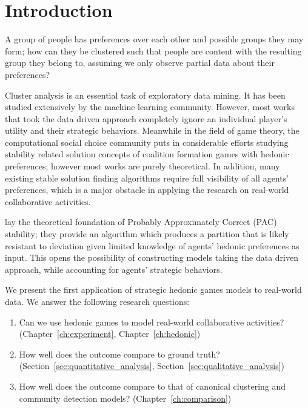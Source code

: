 
\chapter{Introduction}
\label{ch:intro}

A group of people has preferences over each other and possible groups
they may form; how can they be clustered such that people are content
with the resulting group they belong to, assuming we only observe partial data about their preferences?

Cluster analysis is an essential task of exploratory data mining.
It has been studied extensively by the machine learning community.
However, most works that took the data driven approach completely ignore an individual player's utility and their strategic behaviors.
Meanwhile in the field of game theory, the computational social choice community puts in considerable efforts studying stability related solution concepts of coalition formation games with hedonic preferences;
however most works are purely theoretical.
In addition, many existing stable solution finding algorithms require full visibility of all agents' preferences, which is a major obstacle in applying the research on real-world collaborative activities.

 lay the theoretical foundation of Probably Approximately Correct (PAC) stability;
they provide an algorithm which produces a partition that is likely resistant to deviation given limited knowledge of agents' hedonic preferences as input.
This opens the possibility of constructing models taking the data driven approach, while accounting for agents' strategic behaviors.

We present the first application of strategic hedonic games models to real-world data.
We answer the following research questions: 
\begin{enumerate}
    \item Can we use hedonic games to model real-world collaborative activities? (Chapter~\ref{ch:experiment}, Chapter~\ref{ch:hedonic})
    \item How well does the outcome compare to ground truth? (Section~\ref{sec:quantitative_analysis}, Section~\ref{sec:qualitative_analysis})
    \item How well does the outcome compare to that of canonical clustering and community detection models? (Chapter~\ref{ch:comparison})
\end{enumerate}

